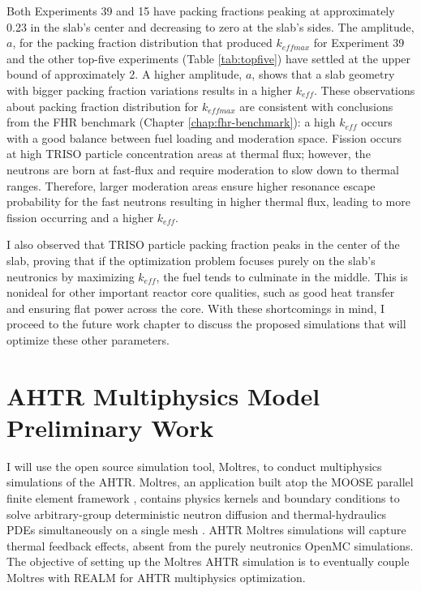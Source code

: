 Both Experiments 39 and 15 have packing fractions peaking at approximately 
0.23 in the slab's center and decreasing to zero at the slab's sides.  
The amplitude, $a$, for the packing fraction distribution that produced $k_{eff max}$ 
for Experiment 39 and the other top-five experiments (Table \ref{tab:topfive}) 
have settled at the upper bound of approximately 2. 
A higher amplitude, $a$, shows that a slab geometry with bigger packing fraction 
variations results in a higher $k_{eff}$. 
These observations about packing fraction distribution for $k_{eff max}$ are 
consistent with conclusions from the \gls{FHR} benchmark (Chapter 
\ref{chap:fhr-benchmark}): a high $k_{eff}$ occurs with a good balance between 
fuel loading and moderation space. 
Fission occurs at high \gls{TRISO} particle concentration areas at thermal flux;
however, the neutrons are born at fast-flux and require moderation to slow down 
to thermal ranges.
Therefore, larger moderation areas ensure higher resonance escape probability for 
the fast neutrons resulting in higher thermal flux, leading to more 
fission occurring and a higher $k_{eff}$. 

I also observed that \gls{TRISO} particle packing fraction peaks in the center 
of the slab, proving that if the optimization problem focuses purely on the slab's neutronics 
by maximizing $k_{eff}$, the fuel tends to culminate in the middle. 
This is nonideal for other important reactor core qualities, such as 
good heat transfer and ensuring flat power across the core. 
With these shortcomings in mind, I proceed to the future work chapter to discuss 
the proposed simulations that will optimize these other parameters. 

\section{AHTR Multiphysics Model Preliminary Work}
I will use the open source simulation tool, Moltres, to conduct multiphysics 
simulations of the \gls{AHTR}. 
Moltres, an application built atop the \gls{MOOSE} parallel finite element 
framework \cite{gaston_moose:_2009}, contains physics kernels and boundary 
conditions to solve arbitrary-group deterministic neutron diffusion and 
thermal-hydraulics \glspl{PDE} simultaneously on a single mesh
\cite{lindsay_introduction_2018,park_advancement_2020}. 
\gls{AHTR} Moltres simulations will capture thermal feedback effects, absent
from the purely neutronics OpenMC simulations.  
The objective of setting up the Moltres \gls{AHTR} simulation is to eventually 
couple Moltres with \gls{REALM} for \gls{AHTR} multiphysics optimization. 

